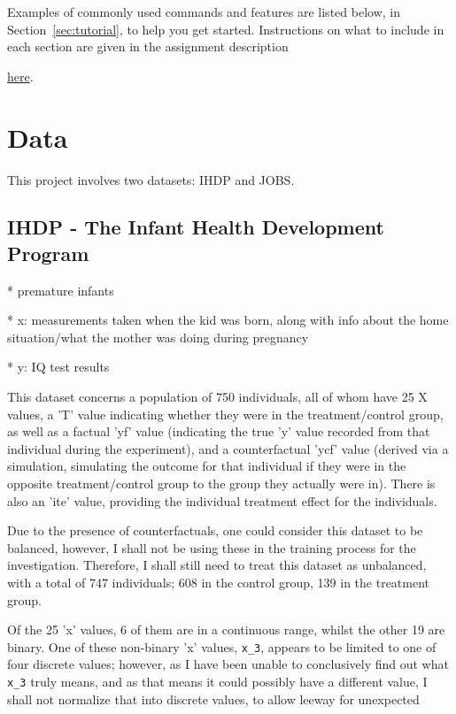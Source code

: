 \documentclass{article}
\begin{document}
Examples of commonly used commands and features are listed below, in
Section~\ref{sec:tutorial}, to help you get started.
Instructions on what to include in each section are given in the assignment description

\href{https://moodle.essex.ac.uk/draftfile.php/196919/user/draft/666046553/2021_CE888_Assignment_1.pdf}{here}.

\section{Data}

This project involves two datasets: IHDP\cite{Gross1993}\cite{BROOKSGUNN1992350} and JOBS\cite{JOBS_LaLonde}.

\subsection{IHDP - The Infant Health Development Program}

* premature infants

* x: measurements taken when the kid was born, along with info about the home situation/what the mother was doing during pregnancy

* y: IQ test results

This dataset concerns a population of 750 individuals, all of whom have 25 X values,
a 'T' value indicating whether they were in the treatment/control group, as well as
a factual 'yf' value (indicating the true 'y' value recorded from that individual during
the experiment), and a counterfactual 'ycf' value (derived via a simulation, simulating
the outcome for that individual if they were in the opposite treatment/control group
to the group they actually were in). There is also an 'ite' value, providing the
individual treatment effect for the individuals. 

Due to the presence of counterfactuals, one could consider this dataset to be balanced,
however, I shall not be using these in the training process for the investigation.
Therefore, I shall still need to treat this dataset as unbalanced,
with a total of 747 individuals; 608 in the control group, 139 in the treatment group.

Of the 25 'x' values, 6 of them are in a continuous range, whilst the other 19 are binary.
One of these non-binary 'x' values, \texttt{x_3}, appears to be limited to one of four discrete
values; however, as I have been unable to conclusively find out what \texttt{x_3} truly means,
and as that means it could possibly have a different value, I shall not normalize that into
discrete values, to allow leeway for unexpected 
\end{document}
